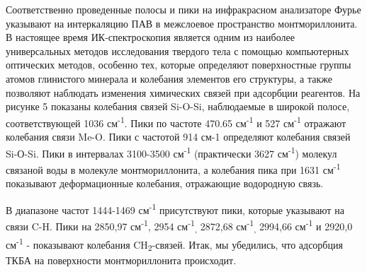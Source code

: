 % 
% 

Соответственно проведенные полосы и пики на инфракрасном анализаторе
Фурье указывают на интеркаляцию ПАВ в межслоевое пространство
монтмориллонита. В настоящее время ИК-спектроскопия является одним из
наиболее универсальных методов исследования твердого тела с помощью
компьютерных оптических методов, особенно тех, которые определяют
поверхностные группы атомов глинистого минерала и колебания элементов
его структуры, а также позволяют наблюдать изменения химических связей
при адсорбции реагентов. На рисунке 5 показаны колебания связей Si-O-Si,
наблюдаемые в широкой полосе, соответствующей 1036
см\textsuperscript{-1}. Пики по частоте 470.65 см\textsuperscript{-1} и
527 см\textsuperscript{-1} отражают колебания связи Me-O. Пики с
частотой 914 см-1 определяют колебания связей Si-О-Si. Пики в интервалах
3100-3500 см\textsuperscript{-1} (практически 3627
см\textsuperscript{-1}) молекул связаной воды в молекуле
монтмориллонита, а колебания пика при 1631 см\textsuperscript{-1}
показывают деформационные колебания, отражающие водородную связь.

В диапазоне частот 1444-1469 см\textsuperscript{-1} присутствуют пики,
которые указывают на связи C-H. Пики на 2850,97 см\textsuperscript{-1},
2954 см\textsuperscript{-1}\textsubscript{,} 2872,68
см\textsuperscript{-1}\textsubscript{,} 2994,66 см\textsuperscript{-1} и
2920,0 см\textsuperscript{-1} - показывают колебания
CH\textsubscript{2}-связей. Итак, мы убедились, что адсорбция ТКБА на
поверхности монтмориллонита происходит.

